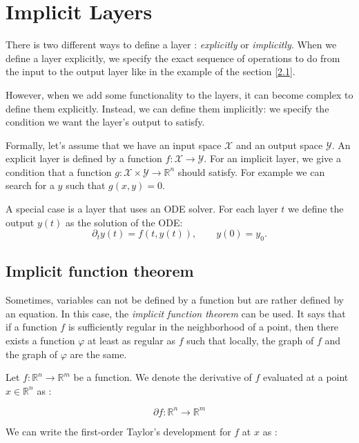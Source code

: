 \documentclass[10pt,a4paper]{article}
\theoremstyle{definition}
\theoremstyle{definition}
\begin{document}

\section{Implicit Layers}

There is two different ways to define a layer : \textit{explicitly} or \textit{implicitly}. When we define a layer explicitly, we specify the exact sequence of operations to do from the input to the output layer like in the example of the section \ref{2.1}. 

However, when we add some functionality to the layers, it can become complex to define them explicitly. Instead, we can define them implicitly: we specify the condition we want the layer's output to satisfy. 

Formally, let's assume that we have an input space $\mathcal{X}$ and an output space $\mathcal{Y}$. An explicit layer is defined by a function $f : \mathcal{X} \rightarrow \mathcal{Y}$. For an implicit layer, we give a condition that a function $g: \mathcal{X} \times \mathcal{Y} \rightarrow \mathbb{R}^n$ should satisfy. For example we can search for a $y$ such that $g(x,y) = 0$.

A special case is a layer that uses an ODE solver. For each layer $t$ we define the output $y(t)$ as the solution of the ODE:
$$\partial_t y(t) = f(t, y(t)), \qquad y(0) = y_0.$$


\subsection{Implicit function theorem}

Sometimes, variables can not be defined by a function but are rather defined by an equation. In this case, the \textit{implicit function theorem} can be used. It says that if a function $f$ is sufficiently regular in the neighborhood of a point, then there exists a function $\varphi$ at least as regular as $f$ such that locally, the graph of $f$ and the graph of $\varphi$ are the same.

Let $f: \mathbb{R}^n \rightarrow \mathbb{R}^m$ be a function.
We denote the derivative of $f$ evaluated at a point $x \in \mathbb{R}^n$ as :

\[ \partial f : \mathbb{R}^n \rightarrow \mathbb{R}^m \]

We can write the first-order Taylor's development for $f$ at $x$ as :
\end{document}
